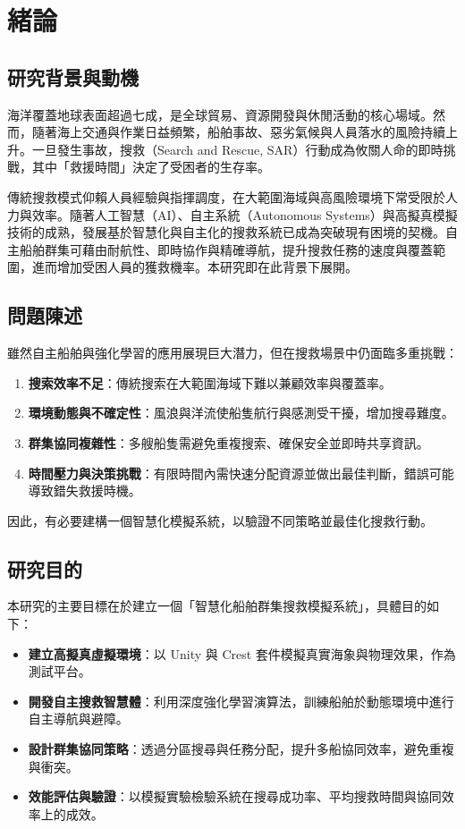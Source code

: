 \documentclass[12pt,a4paper]{article}
\begin{document}
\section{緒論}

\subsection{研究背景與動機}
海洋覆蓋地球表面超過七成，是全球貿易、資源開發與休閒活動的核心場域。然而，隨著海上交通與作業日益頻繁，船舶事故、惡劣氣候與人員落水的風險持續上升。一旦發生事故，搜救（Search and Rescue, SAR）行動成為攸關人命的即時挑戰，其中「救援時間」決定了受困者的生存率。

傳統搜救模式仰賴人員經驗與指揮調度，在大範圍海域與高風險環境下常受限於人力與效率。隨著人工智慧（AI）、自主系統（Autonomous Systems）與高擬真模擬技術的成熟，發展基於智慧化與自主化的搜救系統已成為突破現有困境的契機。自主船舶群集可藉由耐航性、即時協作與精確導航，提升搜救任務的速度與覆蓋範圍，進而增加受困人員的獲救機率。本研究即在此背景下展開。

\subsection{問題陳述}
雖然自主船舶與強化學習的應用展現巨大潛力，但在搜救場景中仍面臨多重挑戰：

\begin{enumerate}
\item \textbf{搜索效率不足}：傳統搜索在大範圍海域下難以兼顧效率與覆蓋率。
\item \textbf{環境動態與不確定性}：風浪與洋流使船隻航行與感測受干擾，增加搜尋難度。
\item \textbf{群集協同複雜性}：多艘船隻需避免重複搜索、確保安全並即時共享資訊。
\item \textbf{時間壓力與決策挑戰}：有限時間內需快速分配資源並做出最佳判斷，錯誤可能導致錯失救援時機。
\end{enumerate}

因此，有必要建構一個智慧化模擬系統，以驗證不同策略並最佳化搜救行動。

\subsection{研究目的}
本研究的主要目標在於建立一個「智慧化船舶群集搜救模擬系統」，具體目的如下：

\begin{itemize}
\item \textbf{建立高擬真虛擬環境}：以 Unity 與 Crest 套件模擬真實海象與物理效果，作為測試平台。
\item \textbf{開發自主搜救智慧體}：利用深度強化學習演算法，訓練船舶於動態環境中進行自主導航與避障。
\item \textbf{設計群集協同策略}：透過分區搜尋與任務分配，提升多船協同效率，避免重複與衝突。
\item \textbf{效能評估與驗證}：以模擬實驗檢驗系統在搜尋成功率、平均搜救時間與協同效率上的成效。
\end{itemize}
\end{document}
